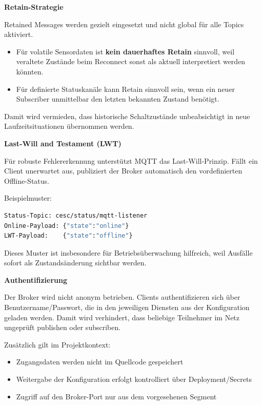 \textbf{Retain-Strategie}

Retained Messages werden gezielt eingesetzt und nicht global für alle Topics aktiviert.

\begin{itemize}
    \item Für volatile Sensordaten ist \textbf{kein dauerhaftes Retain} sinnvoll, weil veraltete Zustände beim Reconnect sonst als aktuell interpretiert werden könnten.
    \item Für definierte Statuskanäle kann Retain sinnvoll sein, wenn ein neuer Subscriber unmittelbar den letzten bekannten Zustand benötigt.
\end{itemize}

Damit wird vermieden, dass historische Schaltzustände unbeabsichtigt in neue Laufzeitsituationen übernommen werden.

\textbf{Last-Will and Testament (LWT)}

Für robuste Fehlererkennung unterstützt MQTT das Last-Will-Prinzip. Fällt ein Client unerwartet aus, publiziert der Broker automatisch den vordefinierten Offline-Status.

Beispielmuster:

\begin{lstlisting}[language=bash,caption={Typisches LWT-Muster für Dienststatus},label={lst:mqtt_lwt_pattern},basicstyle=\ttfamily\small]
Status-Topic: cesc/status/mqtt-listener
Online-Payload: {"state":"online"}
LWT-Payload:    {"state":"offline"}
\end{lstlisting}

Dieses Muster ist insbesondere für Betriebsüberwachung hilfreich, weil Ausfälle sofort als Zustandsänderung sichtbar werden.

\textbf{Authentifizierung}

Der Broker wird nicht anonym betrieben. Clients authentifizieren sich über Benutzername/Passwort, die in den jeweiligen Diensten aus der Konfiguration geladen werden. Damit wird verhindert, dass beliebige Teilnehmer im Netz ungeprüft publishen oder subscriben.

Zusätzlich gilt im Projektkontext:

\begin{itemize}
    \item Zugangsdaten werden nicht im Quellcode gespeichert
    \item Weitergabe der Konfiguration erfolgt kontrolliert über Deployment/Secrets
    \item Zugriff auf den Broker-Port nur aus dem vorgesehenen Segment
\end{itemize}


